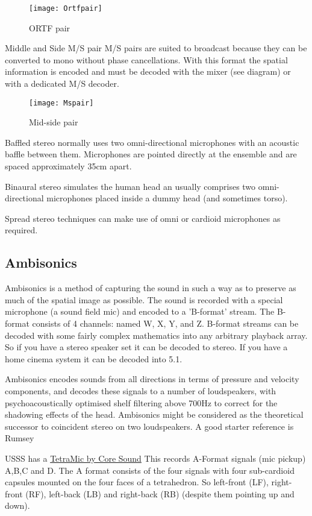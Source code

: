 \begin{figure}[H]
\centering
\texttt{[image: Ortfpair]}\caption{ORTF pair}
\label{fig:ortfpair}
\end{figure}

Middle and Side M/S pair
M/S pairs are suited to broadcast because they can be converted to mono without phase cancellations. With this format the spatial information is encoded and must be decoded with the mixer (see diagram) or with a dedicated M/S decoder.

\begin{figure}[H]
\centering
\texttt{[image: Mspair]}\caption{Mid-side pair}
\label{fig:midsidepair}
\end{figure}

Baffled stereo normally uses two omni-directional microphones with an acoustic baffle between them. Microphones are pointed directly at the ensemble and are spaced approximately 35cm apart.

Binaural stereo simulates the human head an usually comprises two omni-directional microphones placed inside a dummy head (and sometimes torso).

Spread stereo techniques can make use of omni or cardioid microphones as required. 

\subsection{Ambisonics}
Ambisonics is a method of capturing the sound in such a way as to preserve as much of the spatial image as possible. The sound is recorded with a special microphone (a sound field mic) and encoded to a 'B-format' stream. The B-format consists of 4 channels: named W, X, Y, and Z. B-format streams can be decoded with some fairly complex mathematics into any arbitrary playback array. So if you have a stereo speaker set it can be decoded to stereo. If you have a home cinema system it can be decoded into 5.1.


Ambisonics encodes sounds from all directions in terms of pressure and velocity components, and decodes these signals to a number of loudspeakers, with psychoacoustically optimised shelf filtering above 700Hz to correct for the shadowing effects of the head. Ambisonics might be considered as the theoretical successor to coincident stereo on two loudspeakers. A good starter reference is Rumsey \citep[pp402-407]{rumsey2006sound} 

USSS has a \href{http://www.core-sound.com/TetraMic/1.php}{TetraMic by Core Sound}
This records A-Format signals (mic pickup) A,B,C and D. The A format consists of the four signals with four sub-cardioid capsules mounted on the four faces of a tetrahedron. So left-front (LF), right-front (RF), left-back (LB) and right-back (RB) (despite them pointing up and down). 


